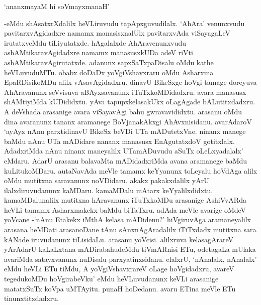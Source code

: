 \begin{shloka}
`ananxmayaM hi soVmayxmanaH'
\end{shloka}

-eMdu shAsatxrXdalilx heVLiruvudu tapApxguvudilalx. `AhAra' venunxvudu pavitarxvAgidadxre namamx manasisxnalUlx pavitarxvAda viSayagaLeV irutatxveMdu tiLiyutatxde. hAgalalxde AhAravenunxvudu ashAMtikaravAgidadxre namamx manasusxkUDa adeV riVti ashAMtikaravAgirutatxde. adanunx sapxSaTxpaDisalu oMdu kathe heVLuvuduMTu. obabx doDaDx yoVgiVshavxraru oMdu Asharxma EpaRDisikoMDu alilx vAsavAgidadxru. dinavU BikeSxge hoVgi tamage doreyuva AhAravanunx seVvisuva aBAyxsavanunx iTuTxkoMDidadxru. avara manasusx shAMtiyiMda kUDididxtu. yAva tapupxkelasakUkx oLagAgade bALutitxdadxru. A deVshada arasanige avara viSayavAgi bahu gwravavididxtu. arasanu oMdu dina avaranunx tananx aramanege BoVjanakAkxgi AhAvxnisidanu. avarAdaroV `ayAyx nAnu parxtidinavU BikeSx beVDi UTa mADutetxVne. ninanx manege baMdu nAnu UTa mADidare nananx manasusx EnAgutatxdoV gotitxlalx. AdadxriMda nAnu ninanx maneyalilx UTamADuvudu aSuTx oLeLxyadalalx' eMdaru. AdarU arasanu balavaMta mADidadxriMda avana aramanege baMdu kuLitukoMDaru. autaNavAda meVle tamamx keYyanunx toLeyalu hoVdAga alilx oMdu mutitxna saravanunx noVDidaru. akakx pakakxdalilx yArU ilalxdiruvudanunx kaMDaru. kamaMDalu mAtarx keYyalilxdidxtu. kamaMDalunalilx mutitxna hAravanunx iTuTxkoMDu arasanige AshiVvARda heVLi tamamx Asharxmakekx baMdu biTaTxru. adAda meVle avarige oMdeV yoVcane -`nAnu Etakekx iMthA kelasa mADidenu?' hiVgiruvAga aramaneyalilx arasana heMDati arasanoDane tAnu sAnxnAgAradalilx iTiTxdadx mutitxna sara kANade iruvudanunx tiLisidaLu. arasanu yoVcisi. alilxruva kelasagArareV yArAdarU kaLaLxtana mADirabahudeMdu tiVmARnisi ETu, odetagaLa mUlaka avariMda satayxvanunx nuDisalu parxyatinxsidanu. elalxrU, `nAnalalx, nAnalalx' eMdu heVLi ETu tiMdu, A yoVgiVshavxrareV oLage hoVgidadxru, avareV tegedukoMDu hoVgirabeVku' eMdu heVLuvudanunx keVLi arasanige matatxSuTx koVpa uMTAyitu. punaH hoDedanu. avaru ETina meVle ETu tinunxtitxdadxru.

